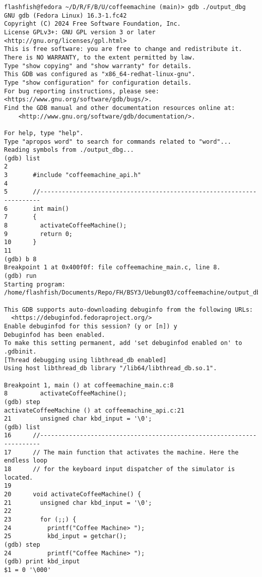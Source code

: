 \documentclass{report}
\begin{document}
\begin{lstlisting}[style=cppstyle, title=\texttt{Terminal Output}]
flashfish@fedora ~/D/R/F/B/U/coffeemachine (main)> gdb ./output_dbg
GNU gdb (Fedora Linux) 16.3-1.fc42
Copyright (C) 2024 Free Software Foundation, Inc.
License GPLv3+: GNU GPL version 3 or later <http://gnu.org/licenses/gpl.html>
This is free software: you are free to change and redistribute it.
There is NO WARRANTY, to the extent permitted by law.
Type "show copying" and "show warranty" for details.
This GDB was configured as "x86_64-redhat-linux-gnu".
Type "show configuration" for configuration details.
For bug reporting instructions, please see:
<https://www.gnu.org/software/gdb/bugs/>.
Find the GDB manual and other documentation resources online at:
    <http://www.gnu.org/software/gdb/documentation/>.

For help, type "help".
Type "apropos word" to search for commands related to "word"...
Reading symbols from ./output_dbg...
(gdb) list
2
3       #include "coffeemachine_api.h"
4
5       //----------------------------------------------------------------------
6       int main()
7       {
8         activateCoffeeMachine();
9         return 0;
10      }
11
(gdb) b 8
Breakpoint 1 at 0x400f0f: file coffeemachine_main.c, line 8.
(gdb) run
Starting program: /home/flashfish/Documents/Repo/FH/BSY3/Uebung03/coffeemachine/output_dbg

This GDB supports auto-downloading debuginfo from the following URLs:
  <https://debuginfod.fedoraproject.org/>
Enable debuginfod for this session? (y or [n]) y
Debuginfod has been enabled.
To make this setting permanent, add 'set debuginfod enabled on' to .gdbinit.
[Thread debugging using libthread_db enabled]
Using host libthread_db library "/lib64/libthread_db.so.1".

Breakpoint 1, main () at coffeemachine_main.c:8
8         activateCoffeeMachine();
(gdb) step
activateCoffeeMachine () at coffeemachine_api.c:21
21        unsigned char kbd_input = '\0';
(gdb) list
16      //----------------------------------------------------------------------
17      // The main function that activates the machine. Here the endless loop
18      // for the keyboard input dispatcher of the simulator is located.
19
20      void activateCoffeeMachine() {
21        unsigned char kbd_input = '\0';
22
23        for (;;) {
24          printf("Coffee Machine> ");
25          kbd_input = getchar();
(gdb) step
24          printf("Coffee Machine> ");
(gdb) print kbd_input
$1 = 0 '\000'
\end{lstlisting}
\end{document}
